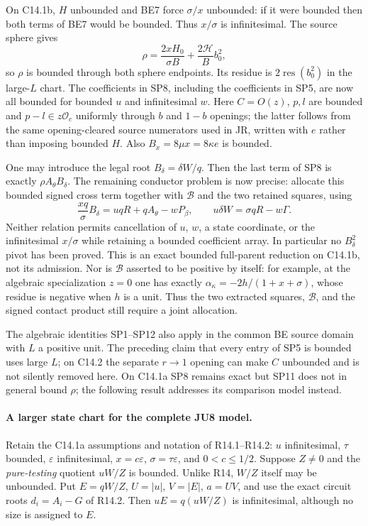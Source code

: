 On C14.1b, $H$ unbounded and BE7 force $\sigma/x$ unbounded:
if it were bounded then both terms of BE7 would be bounded.
Thus $x/\sigma$ is infinitesimal. The source sphere gives
\[
 \rho=\frac{2xH_0}{\sigma B}
                  +\frac{2\mathcal H}{B}b_0^2,
 \tag{SP11}
\]
so $\rho$ is bounded through both sphere endpoints. Its residue is
$2\operatorname{res}(b_0^2)$ in the large-$L$ chart.
The coefficients in SP8, including the coefficients in SP5, are now
all bounded for bounded $u$ and infinitesimal $w$. Here
$C=O(z)$, $p,l$ are bounded and $p-l\in z\mathcal O_c$ uniformly
through $b$ and $1-b$ openings; the latter follows from the same
opening-cleared source numerators used in JR, written with $e$ rather
than imposing bounded $H$. Also $B_x=8\mu x=8\kappa e$ is bounded.

One may introduce the legal root
$B_\delta=\delta W/q$. Then the last term of SP8 is exactly
$\rho A_\theta B_\delta$. The remaining conductor problem is now
precise: allocate this bounded signed cross term together with
$\mathscr B$ and the two retained squares, using
\[
 \frac{xq}{\sigma}B_\delta
       =uqR+qA_\theta-wP_\beta,
 \qquad u\delta W=\sigma qR-w\Gamma.
 \tag{SP12}
\]
Neither relation permits cancellation of $u$, $w$, a state coordinate,
or the infinitesimal $x/\sigma$ while retaining a bounded coefficient
array. In particular no $B_\delta^2$ pivot has been proved. This is
an exact bounded full-parent reduction on C14.1b, not its admission.
Nor is $\mathscr B$ asserted to be positive by itself: for example,
at the algebraic specialization $z=0$ one has exactly
$\alpha_\kappa=-2h/(1+x+\sigma)$, whose residue is negative when
$h$ is a unit. Thus the two extracted squares, $\mathscr B$, and the
signed contact product still require a joint allocation.

The algebraic identities SP1--SP12 also apply in the common BE source
domain with $L$ a positive unit. The preceding claim that every entry
of SP5 is bounded uses large $L$; on C14.2 the separate $r\to1$
opening can make $C$ unbounded and is not silently removed here.
On C14.1a SP8 remains exact but SP11 does not in general bound
$\rho$; the following result addresses its comparison model instead.

\paragraph{A larger state chart for the complete JU8 model.}
Retain the C14.1a assumptions and notation of R14.1--R14.2:
$u$ infinitesimal, $\tau$ bounded, $\varepsilon$ infinitesimal,
$x=c\varepsilon$, $\sigma=\tau\varepsilon$, and $0<c\le1/2$.
Suppose $Z\ne0$ and the \emph{pure-testing} quotient
$uW/Z$ is bounded. Unlike R14, $W/Z$ itself may be unbounded.
Put $E=qW/Z$, $U=|u|$, $V=|E|$, $a=UV$, and use the exact
circuit roots $d_i=A_i-G$ of R14.2. Then $uE=q(uW/Z)$ is
infinitesimal, although no size is assigned to $E$.

